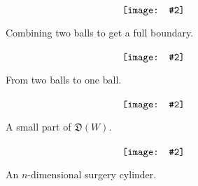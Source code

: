 \documentclass{pnastwo}
\newcommand{\cell}{\mathfrak{D}}
\newcommand{\mathfig}[2]{\ensuremath{\hspace{-3pt}\begin{array}{c}%
  \raisebox{-2.5pt}{\texttt{[image: \#2]}}%
\end{array}\hspace{-3pt}}}
\begin{document}



\begin{figure}
\begin{equation*}
\mathfig{0.18}{figure1}
\end{equation*}
\caption{Combining two balls to get a full boundary.}\label{blah3}\end{figure}

\begin{figure}
\begin{equation*}
\mathfig{0.14}{figure2}
\end{equation*}
\caption{From two balls to one ball.}\label{blah5}\end{figure}

\begin{figure}
\begin{equation*}
\mathfig{.23}{zz2}
\end{equation*}
\caption{A small part of $\cell(W)$.}
\label{partofJfig}
\end{figure}

\begin{figure}
$$\mathfig{.4}{mapping-cylinders}$$
\caption{An $n$-dimensional surgery cylinder.}\label{delfig2}
\end{figure}






\end{document}
